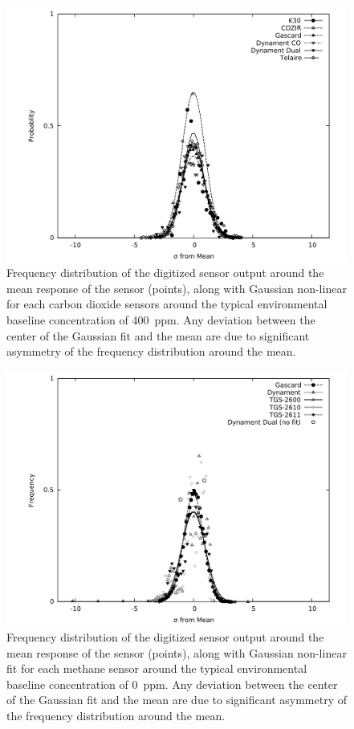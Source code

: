 \documentclass[times]{joehreview}
\begin{document}
	\begin{figure}[!t]
		\centering
		\includegraphics[width=\columnwidth]{honey7.pdf}
		\caption{Frequency distribution of the digitized sensor output around the mean response of the sensor (points), along with Gaussian non-linear for each carbon dioxide sensors around the typical environmental baseline concentration of 400~ppm.  Any deviation between the center of the Gaussian fit and the mean are due to significant asymmetry of the frequency distribution around the mean.}
		\label{fig:gaussco2}
	\end{figure}
	
	\begin{figure}[!t]
		\centering
		\includegraphics[width=\columnwidth]{honey8.pdf}
		\caption{Frequency distribution of the digitized sensor output around the mean response of the sensor (points), along with Gaussian non-linear fit for each methane sensor around the typical environmental baseline concentration of 0~ppm.  Any deviation between the center of the Gaussian fit and the mean are due to significant asymmetry of the frequency distribution around the mean.}
		\label{fig:gaussch4}
	\end{figure}
	
\end{document}
